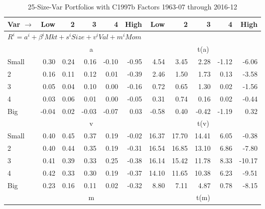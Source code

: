
\begin{table}[!ht]
\centering
\caption{25-Size-Var Portfolios with C1997b Factors 1963-07 through 2016-12}
\begin{tabular}{lrrrrrrrrrr}
  \toprule
    Var $\rightarrow$ & Low & 2 & 3 & 4 & High & Low & 2 & 3 & 4 & High \\ 
  \midrule
  \multicolumn{11}{l}{$R^i=a^i+\beta^iMkt+s^iSize+v^iVal+m^iMom$} \\

  
    
      & \multicolumn{5}{c}{a} & \multicolumn{5}{c}{t(a)}
    
    \\
      \cmidrule(r){2-6} \cmidrule(r){7-11}

    Small   & 0.30  & 0.24  & 0.16  & -0.10  & -0.95  & 4.54  & 3.45  & 2.28  & -1.12  & -6.06  \\
         2  & 0.16  & 0.11  & 0.12  & 0.01  & -0.39  & 2.46  & 1.50  & 1.73  & 0.13  & -3.58  \\
         3  & 0.05  & 0.04  & 0.10  & 0.00  & -0.16  & 0.72  & 0.65  & 1.30  & 0.02  & -1.56  \\
         4  & 0.03  & 0.06  & 0.01  & 0.00  & -0.05  & 0.31  & 0.74  & 0.16  & 0.02  & -0.44  \\
    Big     & -0.04  & 0.02  & -0.03  & -0.07  & 0.03  & -0.58  & 0.40  & -0.42  & -1.19  & 0.32  \\

  
    
      & \multicolumn{5}{c}{v} & \multicolumn{5}{c}{t(v)}
    
    \\
      \cmidrule(r){2-6} \cmidrule(r){7-11}

    Small   & 0.40  & 0.45  & 0.37  & 0.19  & -0.02  & 16.37  & 17.70  & 14.41  & 6.05  & -0.38  \\
         2  & 0.40  & 0.44  & 0.35  & 0.19  & -0.31  & 16.54  & 16.85  & 13.10  & 6.86  & -7.80  \\
         3  & 0.41  & 0.39  & 0.33  & 0.25  & -0.38  & 16.14  & 15.42  & 11.78  & 8.33  & -10.17  \\
         4  & 0.42  & 0.33  & 0.30  & 0.19  & -0.37  & 14.10  & 11.65  & 10.38  & 6.23  & -9.51  \\
    Big     & 0.23  & 0.16  & 0.11  & 0.02  & -0.32  & 8.80  & 7.11  & 4.87  & 0.78  & -8.15  \\

  
    
      & \multicolumn{5}{c}{m} & \multicolumn{5}{c}{t(m)}
    

\end{tabular}
\end{table}
